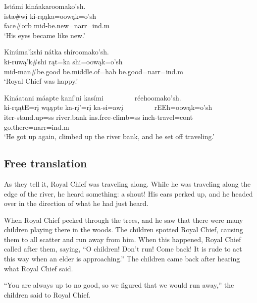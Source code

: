 \begin{exe}
\item\label{EJ108} \glll Istámi kináakaroomako'sh.\\
ista\#wį ki-rąąka=oowąk=o'sh\\
\textnormal{face}\#\textnormal{orb} mid-\textnormal{be.new}=narr=ind.m\\
\glt `His eyes became like new.'

\item\label{EJ109} \glll Kinúma'kshi nátka shíroomako'sh.\\
ki-ruwą'k\#shi rąt=ka shi=oowąk=o'sh\\
mid-\textnormal{man}\#\textnormal{be.good} \textnormal{be.middle.of}=hab \textnormal{be.good}=narr=ind.m\\
\glt `Royal Chief was happy.'

\item\label{EJ110} \glll Kináatani máapte kaní'ni kasími ~ ~ ~ ~ ~ réehoomako'sh.\\
ki-rąątE=rį wąąpte ka-rį'=rį ka-si=awį ~ ~ ~ ~ ~ rEEh=oowąk=o'sh\\
iter-\textnormal{stand.up}=ss \textnormal{river.bank} ins.frce-\textnormal{climb}=ss inch-\textnormal{travel}=cont ~ ~ ~ ~ ~ \textnormal{go.there}=narr=ind.m\\
\glt `He got up again, climbed up the river bank, and he set off traveling.'

\end{exe}

\subsection{Free translation}\label{Ch6FreeTranslation}

As they tell it, Royal Chief was traveling along. While he was traveling along the edge of the river, he heard something: a shout! His ears perked up, and he headed over in the direction of what he had just heard.

When Royal Chief peeked through the trees, and he saw that there were many children playing there in the woods. The children spotted Royal Chief, causing them to all scatter and run away from him. When this happened, Royal Chief called after them, saying, ``O children! Don't run! Come back! It is rude to act this way when an elder is approaching.'' The children came back after hearing what Royal Chief said.

``You are always up to no good, so we figured that we would run away,'' the children said to Royal Chief. 


